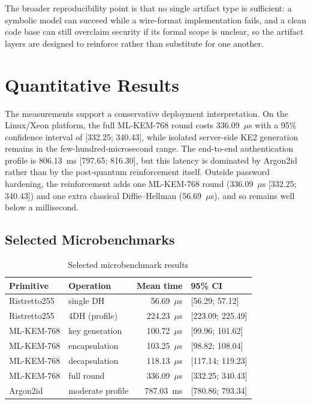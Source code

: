 \documentclass[conference]{IEEEtran}
\begin{document}
The broader reproducibility point is that no single artifact type is sufficient: a symbolic model can succeed while a wire-format implementation fails, and a clean code base can still overclaim security if its formal scope is unclear, so the artifact layers are designed to reinforce rather than substitute for one another.

\section{Quantitative Results}\label{sec:results}

The measurements support a conservative deployment interpretation. On the Linux/Xeon platform, the full ML-KEM-768 round costs 336.09~$\mu$s with a 95\% confidence interval of [332.25; 340.43], while isolated server-side KE2 generation remains in the few-hundred-microsecond range. The end-to-end authentication profile is 806.13~ms [797.65; 816.30], but this latency is dominated by Argon2id \cite{argon2rfc2021} rather than by the post-quantum reinforcement itself. Outside password hardening, the reinforcement adds one ML-KEM-768 round (336.09~$\mu$s [332.25; 340.43]) and one extra classical Diffie--Hellman (56.69~$\mu$s), and so remains well below a millisecond.

\subsection{Selected Microbenchmarks}

\begin{table}[t]
\caption{Selected microbenchmark results}
\label{tab:acit-microbench}
\centering
\scriptsize
\begin{tabularx}{\columnwidth}{@{}L{1.6cm}L{1.45cm}rY@{}}
\toprule
Primitive & Operation & Mean time & 95\% CI \\
\midrule
Ristretto255 & single DH & 56.69~$\mu$s & [56.29; 57.12] \\
Ristretto255 & 4DH (profile) & 224.23~$\mu$s & [223.09; 225.49] \\
ML-KEM-768 & key generation & 100.72~$\mu$s & [99.96; 101.62] \\
ML-KEM-768 & encapsulation & 103.25~$\mu$s & [98.82; 108.04] \\
ML-KEM-768 & decapsulation & 118.13~$\mu$s & [117.14; 119.23] \\
ML-KEM-768 & full round & 336.09~$\mu$s & [332.25; 340.43] \\
Argon2id & moderate profile & 787.03~ms & [780.86; 793.34] \\
\bottomrule
\end{tabularx}
\end{table}
\end{document}
